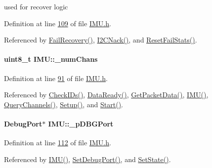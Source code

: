 used for recover logic 



Definition at line \hyperlink{_i_m_u_8h_source_l00109}{109} of file \hyperlink{_i_m_u_8h_source}{IMU.h}.



Referenced by \hyperlink{_i_m_u_8cpp_source_l00398}{FailRecovery()}, \hyperlink{_i_m_u_8cpp_source_l00463}{I2CNack()}, and \hyperlink{_i_m_u_8h_source_l00200}{ResetFailStats()}.

\hypertarget{class_i_m_u_a27df580b4559aaf3234469bfe16eb158}{
\paragraph[{\_\-numChans}]{\setlength{\rightskip}{0pt plus 5cm}uint8\_\-t {\bf IMU::\_\-numChans}}\hfill}
\label{class_i_m_u_a27df580b4559aaf3234469bfe16eb158}


Definition at line \hyperlink{_i_m_u_8h_source_l00091}{91} of file \hyperlink{_i_m_u_8h_source}{IMU.h}.



Referenced by \hyperlink{_i_m_u_8cpp_source_l00651}{CheckIDs()}, \hyperlink{_i_m_u_8cpp_source_l00564}{DataReady()}, \hyperlink{_i_m_u_8cpp_source_l00603}{GetPacketData()}, \hyperlink{_i_m_u_8cpp_source_l00020}{IMU()}, \hyperlink{_i_m_u_8cpp_source_l00120}{QueryChannels()}, \hyperlink{_i_m_u_8cpp_source_l00194}{Setup()}, and \hyperlink{_i_m_u_8cpp_source_l00239}{Start()}.

\hypertarget{class_i_m_u_a83a2ffaf84cc04f17ff0301181c45366}{
\paragraph[{\_\-pDBGPort}]{\setlength{\rightskip}{0pt plus 5cm}DebugPort$\ast$ {\bf IMU::\_\-pDBGPort}}\hfill}
\label{class_i_m_u_a83a2ffaf84cc04f17ff0301181c45366}


Definition at line \hyperlink{_i_m_u_8h_source_l00112}{112} of file \hyperlink{_i_m_u_8h_source}{IMU.h}.



Referenced by \hyperlink{_i_m_u_8cpp_source_l00020}{IMU()}, \hyperlink{_i_m_u_8cpp_source_l00143}{SetDebugPort()}, and \hyperlink{_i_m_u_8h_source_l00178}{SetState()}.

